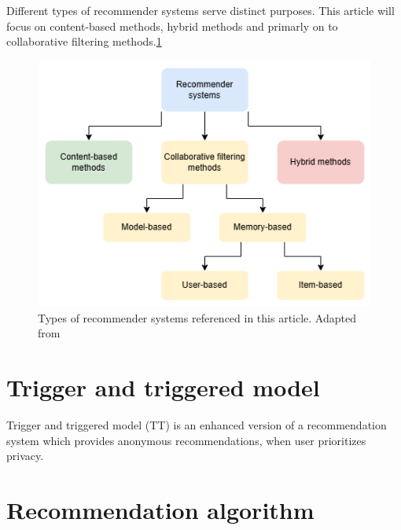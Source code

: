 \documentclass[10pt,twoside,english,a4paper]{article}
\begin{document}
Different types of recommender systems serve distinct purposes. This article will focus on content-based methods, hybrid methods and primarly on to collaborative filtering methods.\ref{fig:fig2}

\begin{figure}[H]
    \includegraphics[width=1\textwidth]{./diagrams/recommender_systems_types.png}
    \caption{Types of recommender systems referenced in this article. Adapted from \cite{10113923}}
    \label{fig:fig2}
\end{figure}

\section{Trigger and triggered model}
Trigger and triggered model (TT) is an enhanced version of a recommendation system which provides anonymous recommendations, when user prioritizes privacy.

\section{Recommendation algorithm}









\end{document}
